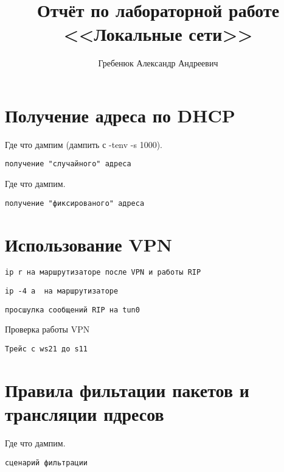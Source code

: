 \documentclass[a4paper,12pt]{article}
\title{Отчёт по лабораторной работе \\ <<Локальные сети>>}
\author{Гребенюк Александр Андреевич}
\begin{document}
\maketitle

\tableofcontents


\section{Получение адреса по DHCP}

Где что дампим (дампить с -tenv -s 1000).

\begin{Verbatim}
получение "случайного" адреса
\end{Verbatim}

Где что дампим.

\begin{Verbatim}
получение "фиксированого" адреса
\end{Verbatim}


\section{Использование VPN}

\begin{Verbatim}
ip r на маршрутизаторе после VPN и работы RIP
\end{Verbatim}

\begin{Verbatim}
ip -4 a  на маршрутизаторе
\end{Verbatim}

\begin{Verbatim}
просшулка сообщений RIP на tun0
\end{Verbatim}

Проверка работы VPN

\begin{Verbatim}
Трейс с ws21 до s11
\end{Verbatim}

\section{Правила фильтации пакетов и трансляции пдресов}

Где что дампим. 

\begin{Verbatim}
сценарий фильтрации
\end{Verbatim}
\end{document}
